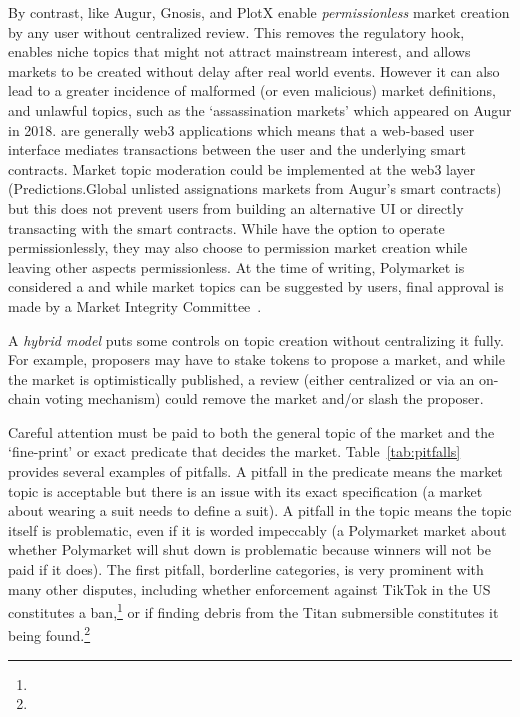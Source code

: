 By contrast, \depms like Augur, Gnosis, and PlotX enable \textit{permissionless} market creation by any user without centralized review. This removes the regulatory hook, enables niche topics that might not attract mainstream interest, and allows markets to be created without delay after real world events. However it can also lead to a greater incidence of malformed (or even malicious) market definitions, and unlawful topics, such as the `assassination markets' which appeared on Augur in 2018. \depms are generally web3 applications which means that a web-based user interface mediates transactions between the user and the underlying smart contracts. Market topic moderation could be implemented at the web3 layer (\eg Predictions.Global unlisted assignations markets from Augur's smart contracts) but this does not prevent users from building an alternative UI or directly transacting with the smart contracts. While \depms have the option to operate permissionlessly, they may also choose to permission market creation while leaving other aspects permissionless. At the time of writing, Polymarket is considered a \depm and while market topics can be suggested by users, final approval is made by a Market Integrity Committee~\cite{ClEsGS21}.

A \textit{hybrid model} puts some controls on topic creation without centralizing it fully. For example, proposers may have to stake tokens to propose a market, and while the market is optimistically published, a review (either centralized or via an on-chain voting mechanism) could remove the market and/or slash the proposer.  



Careful attention must be paid to both the general topic of the market and the `fine-print' or exact predicate that decides the market. Table~\ref{tab:pitfalls} provides several examples of pitfalls. A pitfall in the predicate means the market topic is acceptable but there is an issue with its exact specification (\eg a market about wearing a suit needs to define a suit). A pitfall in the topic means the topic itself is problematic, even if it is worded impeccably (\eg a Polymarket market about whether Polymarket will shut down is problematic because winners will not be paid if it does). The first pitfall, borderline categories, is very prominent with many other disputes, including whether enforcement against TikTok in the US constitutes a ban,\footnote{} or if finding debris from the Titan submersible constitutes it being found.\footnote{} 

